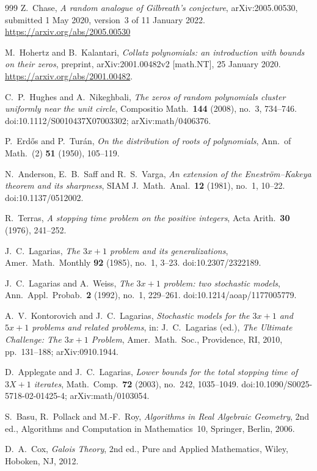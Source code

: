 \documentclass[11pt,a4paper]{article}
\theoremstyle{definition}
\theoremstyle{remark}
\numberwithin{equation}{section}
\begin{document}
\begin{thebibliography}{999}
Z.~Chase, \emph{A random analogue of Gilbreath's conjecture}, arXiv:2005.00530,
submitted 1 May 2020, version~3 of 11 January 2022.
\url{https://arxiv.org/abs/2005.00530}

M.~Hohertz and B.~Kalantari,
\emph{Collatz polynomials: an introduction with bounds on their zeros},
preprint, arXiv:2001.00482v2 [math.NT], 25 January 2020.
\url{https://arxiv.org/abs/2001.00482}.

C.~P.~Hughes and A.~Nikeghbali,
\emph{The zeros of random polynomials cluster uniformly near the unit circle},
Compositio Math.\ \textbf{144} (2008), no.~3, 734--746.
doi:10.1112/S0010437X07003302; arXiv:math/0406376.

P.~Erd\H{o}s and P.~Tur\'an,
\emph{On the distribution of roots of polynomials},
Ann.\ of Math.\ (2) \textbf{51} (1950), 105--119.

N.~Anderson, E.~B.~Saff and R.~S.~Varga,
\emph{An extension of the Enestr\"om--Kakeya theorem and its sharpness},
SIAM J.\ Math.\ Anal.\ \textbf{12} (1981), no.~1, 10--22.
doi:10.1137/0512002.

R.~Terras,
\emph{A stopping time problem on the positive integers},
Acta Arith.\ \textbf{30} (1976), 241--252.

J.~C.~Lagarias,
\emph{The $3x+1$ problem and its generalizations},
Amer.\ Math.\ Monthly \textbf{92} (1985), no.~1, 3--23.
doi:10.2307/2322189.

J.~C.~Lagarias and A.~Weiss,
\emph{The $3x+1$ problem: two stochastic models},
Ann.\ Appl.\ Probab.\ \textbf{2} (1992), no.~1, 229--261.
doi:10.1214/aoap/1177005779.

A.~V.~Kontorovich and J.~C.~Lagarias,
\emph{Stochastic models for the $3x+1$ and $5x+1$ problems and related problems},
in: J.~C.~Lagarias (ed.), \emph{The Ultimate Challenge: The $3x+1$ Problem},
Amer.\ Math.\ Soc., Providence, RI, 2010, pp.~131--188; arXiv:0910.1944.

D.~Applegate and J.~C.~Lagarias,
\emph{Lower bounds for the total stopping time of $3X+1$ iterates},
Math.\ Comp.\ \textbf{72} (2003), no.~242, 1035--1049.
doi:10.1090/S0025-5718-02-01425-4; arXiv:math/0103054.

S.~Basu, R.~Pollack and M.-F.~Roy,
\emph{Algorithms in Real Algebraic Geometry}, 2nd ed.,
Algorithms and Computation in Mathematics~10, Springer, Berlin, 2006.

D.~A.~Cox,
\emph{Galois Theory}, 2nd ed.,
Pure and Applied Mathematics, Wiley, Hoboken, NJ, 2012.


\end{thebibliography}
\end{document}
